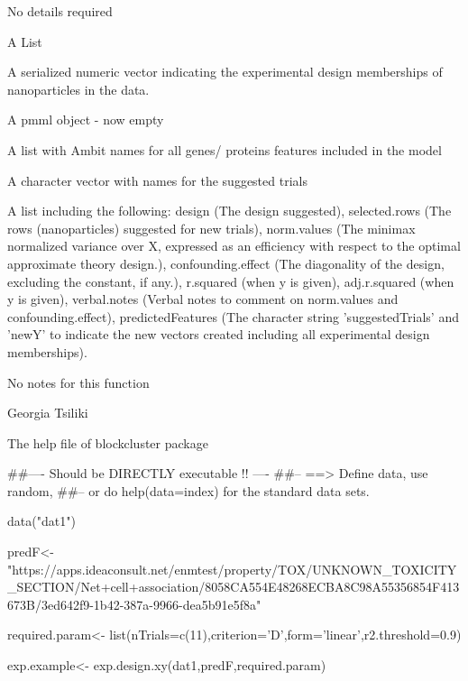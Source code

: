 \documentclass[letterpaper]{book}
\begin{document}
%
\begin{Details}\relax
No details required 
\end{Details}
%
\begin{Value}
A List 
\begin{ldescription}
\item[\code{rawModel}]  A serialized numeric vector indicating the experimental design memberships of nanoparticles in the data.
\item[\code{pmmlModel}]  A pmml object - now empty
\item[\code{independentFeatures}]  A list with Ambit names for all genes/ proteins features included in the model 
\item[\code{predictedFeatures}] A character vector with names for the suggested trials
\item[\code{additionalInfo}]  A list including the following: design (The design suggested), selected.rows (The rows (nanoparticles) suggested for new trials), norm.values (The minimax normalized variance over X, expressed as an efficiency with respect to the optimal approximate theory design.), confounding.effect (The diagonality of the design, excluding the constant, if any.), r.squared (when y is given), adj.r.squared (when y is given), verbal.notes (Verbal notes to comment on norm.values and confounding.effect), predictedFeatures (The character string 'suggestedTrials' and 'newY' to indicate the new vectors created including all experimental design memberships).
\end{ldescription}
\end{Value}
%
\begin{Note}\relax
 No notes for this function 
\end{Note}
%
\begin{Author}\relax
Georgia Tsiliki
\end{Author}
%
\begin{References}\relax
The help file of blockcluster package 
\end{References}
%
\begin{Examples}
\begin{ExampleCode}
##---- Should be DIRECTLY executable !! ----
##-- ==>  Define data, use random,
##--  or do  help(data=index)  for the standard data sets.

data("dat1")

predF<- "https://apps.ideaconsult.net/enmtest/property/TOX/UNKNOWN_TOXICITY_SECTION/Net+cell+association/8058CA554E48268ECBA8C98A55356854F413673B/3ed642f9-1b42-387a-9966-dea5b91e5f8a"

required.param<- list(nTrials=c(11),criterion='D',form='linear',r2.threshold=0.9)

exp.example<- exp.design.xy(dat1,predF,required.param) 

\end{ExampleCode}
\end{Examples}
\end{document}
